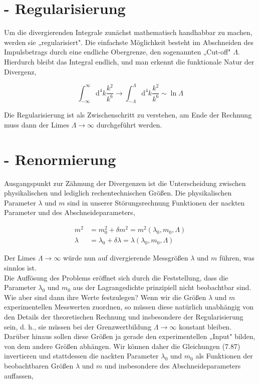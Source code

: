 \documentclass[10pt, letterpaper]{article}
\begin{document}
\section*{- Regularisierung}
Um die divergierenden Integrale zunächst mathematisch handhabbar zu machen, werden sie „regularisiert". Die einfachste Möglichkeit besteht im Abschneiden des Impulsbetrags durch eine endliche Obergrenze, den sogenannten „Cut-off" $\Lambda$. Hierdurch bleibt das Integral endlich, und man erkennt die funktionale Natur der Divergenz,

$$
\int_{-\infty}^{\infty} \mathrm{d}^{4} k \frac{k^{2}}{k^{6}} \rightarrow \int_{-\Lambda}^{\Lambda} \mathrm{d}^{4} k \frac{k^{2}}{k^{6}} \sim \ln \Lambda
$$

Die Regularisierung ist als Zwischenschritt zu verstehen, am Ende der Rechnung muss dann der Limes $\Lambda \rightarrow \infty$ durchgeführt werden.

\section*{- Renormierung}
Ausgangspunkt zur Zähmung der Divergenzen ist die Unterscheidung zwischen physikalischen und lediglich rechentechnischen Größen. Die physikalischen Parameter $\lambda$ und $m$ sind in unserer Störungsrechnung Funktionen der nackten Parameter und des Abschneideparameters,

$$
\begin{aligned}
m^{2} & =m_{0}^{2}+\delta m^{2}=m^{2}\left(\lambda_{0}, m_{0}, \Lambda\right) \\
\lambda & =\lambda_{0}+\delta \lambda=\lambda\left(\lambda_{0}, m_{0}, \Lambda\right)
\end{aligned}
$$

Der Limes $\Lambda \rightarrow \infty$ würde nun auf divergierende Messgrößen $\lambda$ und $m$ führen, was sinnlos ist.\\
Die Auffösung des Problems eröffnet sich durch die Feststellung, dass die Parameter $\lambda_{0}$ und $m_{0}$ aus der Lagrangedichte prinzipiell nicht beobachtbar sind. Wie aber sind dann ihre Werte festzulegen? Wenn wir die Größen $\lambda$ und $m$ experimentellen Messwerten zuordnen, so müssen diese natürlich unabhängig von den Details der theoretischen Rechnung und insbesondere der Regularisierung sein, d. h., sie müssen bei der Grenzwertbildung $\Lambda \rightarrow \infty$ konstant bleiben. Darüber hinaus sollen diese Größen ja gerade den experimentellen „Input" bilden, von dem andere Größen abhängen. Wir können daher die Gleichungen (7.87) invertieren und stattdessen die nackten Parameter $\lambda_{0}$ und $m_{0}$ als Funktionen der beobachtbaren Größen $\lambda$ und $m$ und insbesondere des Abschneideparameters auffassen,
\end{document}
